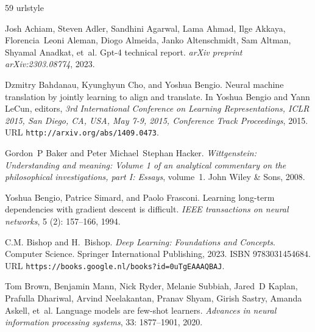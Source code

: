 \begin{thebibliography}{59}
\providecommand{\natexlab}[1]{#1}
\providecommand{\url}[1]{\texttt{#1}}
\expandafter\ifx\csname urlstyle\endcsname\relax
  \providecommand{\doi}[1]{doi: #1}\else
  \providecommand{\doi}{doi: \begingroup \urlstyle{rm}\Url}\fi

Josh Achiam, Steven Adler, Sandhini Agarwal, Lama Ahmad, Ilge Akkaya, Florencia~Leoni Aleman, Diogo Almeida, Janko Altenschmidt, Sam Altman, Shyamal Anadkat, et~al.
\newblock Gpt-4 technical report.
\newblock \emph{arXiv preprint arXiv:2303.08774}, 2023.

Dzmitry Bahdanau, Kyunghyun Cho, and Yoshua Bengio.
\newblock Neural machine translation by jointly learning to align and translate.
\newblock In Yoshua Bengio and Yann LeCun, editors, \emph{3rd International Conference on Learning Representations, {ICLR} 2015, San Diego, CA, USA, May 7-9, 2015, Conference Track Proceedings}, 2015.
\newblock URL \url{http://arxiv.org/abs/1409.0473}.

Gordon~P Baker and Peter Michael~Stephan Hacker.
\newblock \emph{Wittgenstein: Understanding and meaning: Volume 1 of an analytical commentary on the philosophical investigations, part I: Essays}, volume~1.
\newblock John Wiley \& Sons, 2008.

Yoshua Bengio, Patrice Simard, and Paolo Frasconi.
\newblock Learning long-term dependencies with gradient descent is difficult.
\newblock \emph{IEEE transactions on neural networks}, 5 (2): 157--166, 1994.

C.M. Bishop and H.~Bishop.
\newblock \emph{Deep Learning: Foundations and Concepts}.
\newblock Computer Science. Springer International Publishing, 2023.
\newblock ISBN 9783031454684.
\newblock URL \url{https://books.google.nl/books?id=0uTgEAAAQBAJ}.

Tom Brown, Benjamin Mann, Nick Ryder, Melanie Subbiah, Jared~D Kaplan, Prafulla Dhariwal, Arvind Neelakantan, Pranav Shyam, Girish Sastry, Amanda Askell, et~al.
\newblock Language models are few-shot learners.
\newblock \emph{Advances in neural information processing systems}, 33: 1877--1901, 2020.


\end{thebibliography}
